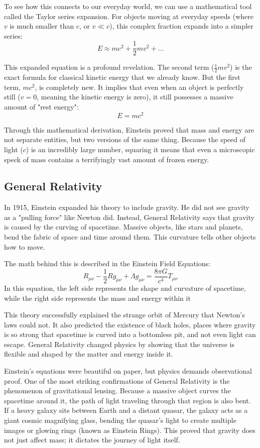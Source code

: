 \documentclass[10pt,a4paper]{article}
\begin{document}
To see how this connects to our everyday world, we can use a mathematical tool called the Taylor series expansion. For objects moving at everyday speeds (where $v$ is much smaller than $c$, or $v \ll c$), this complex fraction expands into a simpler series:
$$E \approx mc^2 + \frac{1}{2}mv^2 + \dots$$

This expanded equation is a profound revelation. The second term ($\frac{1}{2}mv^2$) is the exact formula for classical kinetic energy that we already know. But the first term, $mc^2$, is completely new. It implies that even when an object is perfectly still ($v = 0$, meaning the kinetic energy is zero), it still possesses a massive amount of "rest energy":
$$E = mc^2$$

Through this mathematical derivation, Einstein proved that mass and energy are not separate entities, but two versions of the same thing. Because the speed of light ($c$) is an incredibly large number, squaring it means that even a microscopic speck of mass contains a terrifyingly vast amount of frozen energy.

\subsection{General Relativity}
In 1915, Einstein expanded his theory to include gravity. He did not see gravity as a "pulling force" like Newton did. Instead, General Relativity says that gravity is caused by the curving of spacetime. Massive objects, like stars and planets, bend the fabric of space and time around them. This curvature tells other objects how to move.

The math behind this is described in the Einstein Field Equations:
$$R_{\mu\nu} - \frac{1}{2}Rg_{\mu\nu} + \Lambda g_{\mu\nu} = \frac{8\pi G}{c^4} T_{\mu\nu}$$
In this equation, the left side represents the shape and curvature of spacetime, while the right side represents the mass and energy within it

This theory successfully explained the strange orbit of Mercury that Newton's laws could not. It also predicted the existence of black holes, places where gravity is so strong that spacetime is curved into a bottomless pit, and not even light can escape. General Relativity changed physics by showing that the universe is flexible and shaped by the matter and energy inside it.

Einstein’s equations were beautiful on paper, but physics demands observational proof. One of the most striking confirmations of General Relativity is the phenomenon of gravitational lensing. Because a massive object curves the spacetime around it, the path of light traveling through that region is also bent.  If a heavy galaxy sits between Earth and a distant quasar, the galaxy acts as a giant cosmic magnifying glass, bending the quasar's light to create multiple images or glowing rings (known as Einstein Rings). This proved that gravity does not just affect mass; it dictates the journey of light itself.
\end{document}
